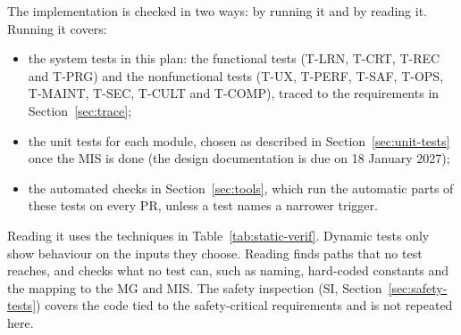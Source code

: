 \documentclass[12pt, titlepage]{article}
\begin{document}
The implementation is checked in two ways: by running it and by reading
it. Running it covers:
\begin{itemize}
\item the system tests in this plan: the functional tests (T-LRN, T-CRT,
T-REC and T-PRG) and the nonfunctional tests (T-UX, T-PERF, T-SAF, T-OPS,
T-MAINT, T-SEC, T-CULT and T-COMP), traced to the requirements in
Section~\ref{sec:trace};
\item the unit tests for each module, chosen as described in
Section~\ref{sec:unit-tests} once the MIS is done (the design documentation
is due on 18 January 2027);
\item the automated checks in Section~\ref{sec:tools}, which run the
automatic parts of these tests on every PR, unless a test names a narrower
trigger.
\end{itemize}
Reading it uses the techniques in Table~\ref{tab:static-verif}. Dynamic
tests only show behaviour on the inputs they choose. Reading finds paths
that no test reaches, and checks what no test can, such as naming,
hard-coded constants and the mapping to the MG and MIS. The safety
inspection (SI, Section~\ref{sec:safety-tests}) covers the code tied to the
safety-critical requirements and is not repeated here.
\end{document}
